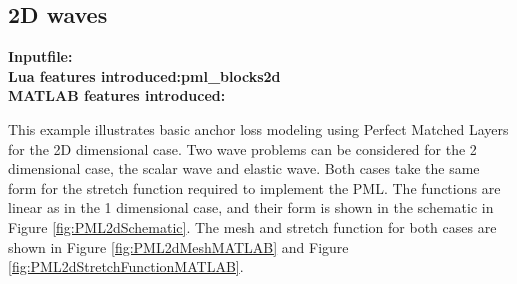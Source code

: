 \subsection{2D waves}
\begin{flushleft}
  \textbf{Inputfile:}
  \\
  \textbf{Lua features introduced:pml\_blocks2d}\\
  \textbf{MATLAB features introduced:}\\
\end{flushleft}
This example illustrates basic anchor loss
modeling using Perfect Matched Layers for the 
2D dimensional case. Two wave problems can
be considered for the 2 dimensional case, the
scalar wave and elastic wave. Both cases take
the same form for the stretch function required
to implement the PML. The functions are linear 
as in the 1 dimensional case, and their form
is shown in the schematic in Figure
\ref{fig:PML2dSchematic}. The mesh and stretch
function for both cases are shown in 
Figure \ref{fig:PML2dMeshMATLAB} and 
Figure \ref{fig:PML2dStretchFunctionMATLAB}.

